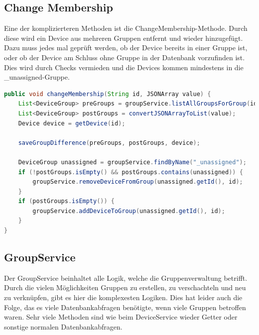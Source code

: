 \subsection{Change Membership}
Eine der komplizierteren Methoden ist die ChangeMembership-Methode. Durch diese wird ein Device aus mehreren Gruppen entfernt und wieder hinzugefügt. Dazu muss jedes mal geprüft werden, ob der Device bereits in einer Gruppe ist, oder ob der Device am Schluss ohne Gruppe in der Datenbank vorzufinden ist. Dies wird durch Checks vermieden und die Devices kommen mindestens in die \_unassigned-Gruppe.
\begin{lstlisting}[language=java]
public void changeMembership(String id, JSONArray value) {
	List<DeviceGroup> preGroups = groupService.listAllGroupsForGroup(id);
	List<DeviceGroup> postGroups = convertJSONArrayToList(value);
	Device device = getDevice(id);

	saveGroupDifference(preGroups, postGroups, device);

	DeviceGroup unassigned = groupService.findByName("_unassigned");
	if (!postGroups.isEmpty() && postGroups.contains(unassigned)) {
		groupService.removeDeviceFromGroup(unassigned.getId(), id);
	}
	if (postGroups.isEmpty()) {
		groupService.addDeviceToGroup(unassigned.getId(), id);
	}
}
\end{lstlisting}

\subsection{GroupService}
Der GroupService beinhaltet alle Logik, welche die Gruppenverwaltung betrifft. Durch die vielen Möglichkeiten Gruppen zu erstellen, zu verschachteln und neu zu verknüpfen, gibt es hier die komplexesten Logiken. Dies hat leider auch die Folge, das es viele Datenbankabfragen benötigte, wenn viele Gruppen betroffen waren. Sehr viele Methoden sind wie beim DeviceService wieder Getter oder sonstige normalen Datenbankabfragen.
\newpage

